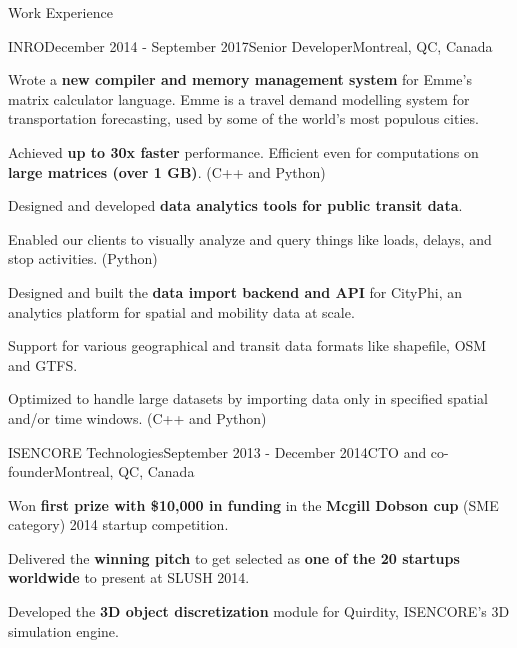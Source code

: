 \documentclass{resume} %
\begin{document}
\begin{rSection}{Work Experience}
\begin{rSubsection}{INRO}{December 2014 - September 2017}{Senior Developer}{Montreal,
        QC, Canada}
\item Wrote a \textbf{new compiler and memory management system} for Emme's
        matrix calculator language. Emme is a travel demand modelling system
        for transportation forecasting, used by some of the world's most
        populous cities.
\begin{lsubSubsection} 
\item Achieved \textbf{up to 30x faster} performance. Efficient even for
        computations on \textbf{large matrices (over 1 GB)}. (C++ and Python)
\end{lsubSubsection}
\item Designed and developed \textbf{data analytics tools for public transit
        data}.
\begin{lsubSubsection}
\item Enabled our clients to visually analyze and query things like
        loads, delays, and stop activities. (Python)
\end{lsubSubsection}
\item Designed and built the \textbf{data import backend and API} for CityPhi,
        an analytics platform for spatial and mobility data at scale.
\begin{lsubSubsection}
\item Support for various geographical and transit data formats like shapefile,
        OSM and GTFS.
\item Optimized to handle large datasets by importing data only in specified
        spatial and/or time windows. (C++ and Python)
\end{lsubSubsection}
\end{rSubsection}

\begin{rSubsection}{ISENCORE Technologies}{September 2013 - December 2014}{CTO
        and co-founder}{Montreal, QC, Canada}
\item Won \textbf{first prize with \$10,000 in funding} in the \textbf{Mcgill
        Dobson cup} (SME category) 2014 startup competition. 
\item Delivered the \textbf{winning pitch} to get selected as \textbf{one of
        the 20 startups worldwide} to present at SLUSH 2014.
\item Developed the \textbf{3D object discretization} module for
        Quirdity, ISENCORE's 3D simulation engine. 
\end{rSubsection}


\end{rSection}
\end{document}
